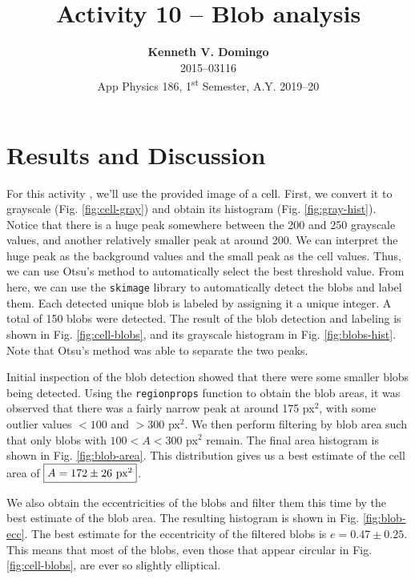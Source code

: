 \documentclass[12pt,a4paper]{article}
\newcommand{\activity}{Activity 10 -- Blob analysis}
\begin{document}
\title{\TitleFont \activity}
\author[ ]{\textbf{Kenneth V. Domingo} \\
2015--03116 \\
App Physics 186, 1\textsuperscript{st} Semester, A.Y. 2019--20}

\maketitle
\thispagestyle{titlestyle}

\section*{Results and Discussion}
\setcounter{section}{1}
For this activity \cite{soriano}, we'll use the provided image of a cell. First, we convert it to grayscale (Fig. \ref{fig:cell-gray}) and obtain its histogram (Fig. \ref{fig:gray-hist}). Notice that there is a huge peak somewhere between the 200 and 250 grayscale values, and another relatively smaller peak at around 200. We can interpret the huge peak as the background values and the small peak as the cell values. Thus, we can use Otsu's method to automatically select the best threshold value. From here, we can use the \texttt{skimage} library to automatically detect the blobs and label them. Each detected unique blob is labeled by assigning it a unique integer. A total of 150 blobs were detected. The result of the blob detection and labeling is shown in Fig. \ref{fig:cell-blobs}, and its grayscale histogram in Fig. \ref{fig:blobs-hist}. Note that Otsu's method was able to separate the two peaks.

Initial inspection of the blob detection showed that there were some smaller blobs being detected. Using the \texttt{regionprops} function to obtain the blob areas, it was observed that there was a fairly narrow peak at around 175 px$^2$, with some outlier values $< 100$ and $> 300$ px$^2$. We then perform filtering by blob area such that only blobs with $100 < A < 300$ px$^2$ remain. The final area histogram is shown in Fig. \ref{fig:blob-area}. This distribution gives us a best estimate of the cell area of $\boxed{A = 172 \pm 26$ px$^2}$.

We also obtain the eccentricities of the blobs and filter them this time by the best estimate of the blob area. The resulting histogram is shown in Fig. \ref{fig:blob-ecc}. The best estimate for the eccentricity of the filtered blobs is $\boxed{e = 0.47 \pm 0.25}$. This means that most of the blobs, even those that appear circular in Fig. \ref{fig:cell-blobs}, are ever so slightly elliptical.
\end{document}
